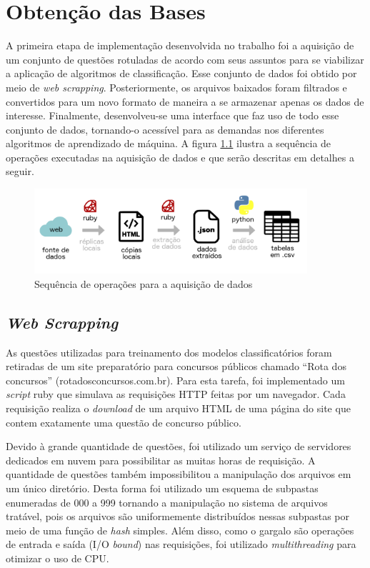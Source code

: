 \chapter{Obtenção das Bases}
\label{chapter:ObtencaoBases}
\noindent

A primeira etapa de implementação desenvolvida no trabalho foi a aquisição de um conjunto de questões rotuladas de acordo com seus assuntos para se viabilizar a aplicação de algoritmos de classificação. Esse conjunto de dados foi obtido por meio de \textit{web scrapping}. Posteriormente, os arquivos baixados foram filtrados e convertidos para um novo formato de maneira a se armazenar apenas os dados de interesse. Finalmente, desenvolveu-se uma interface que faz uso de todo esse conjunto de dados, tornando-o acessível para as demandas nos diferentes algoritmos de aprendizado de máquina. A figura \ref{fig:data_processing_pipeline} ilustra a sequência de operações executadas na aquisição de dados e que serão descritas em detalhes a seguir.

\begin{figure}[!ht]
	\centering
	\includegraphics[width=0.9\textwidth]{figures/data_processing_pipeline.PNG}
	\caption{Sequência de operações para a aquisição de dados}
	\label{fig:data_processing_pipeline}
\end{figure}

\section{\textit{Web Scrapping}}

As questões utilizadas para treinamento dos modelos classificatórios foram retiradas de um site preparatório para concursos públicos chamado “Rota dos concursos” (rotadosconcursos.com.br). Para esta tarefa, foi implementado um \textit{script} ruby que simulava as requisições HTTP feitas por um navegador. Cada requisição realiza o \textit{download} de um arquivo HTML de uma página do site que contem exatamente uma questão de concurso público.

Devido à grande quantidade de questões, foi utilizado um serviço de servidores dedicados em nuvem para possibilitar as muitas horas de requisição. A quantidade de questões também impossibilitou a manipulação dos arquivos em um único diretório. Desta forma foi utilizado um esquema de subpastas enumeradas de 000 a 999 tornando a manipulação no sistema de arquivos tratável, pois os arquivos são uniformemente distribuídos nessas subpastas por meio de uma função de \textit{hash} simples. Além disso, como o gargalo são operações de entrada e saída (I/O \textit{bound}) nas requisições, foi utilizado \textit{multithreading} para otimizar o uso de CPU.

